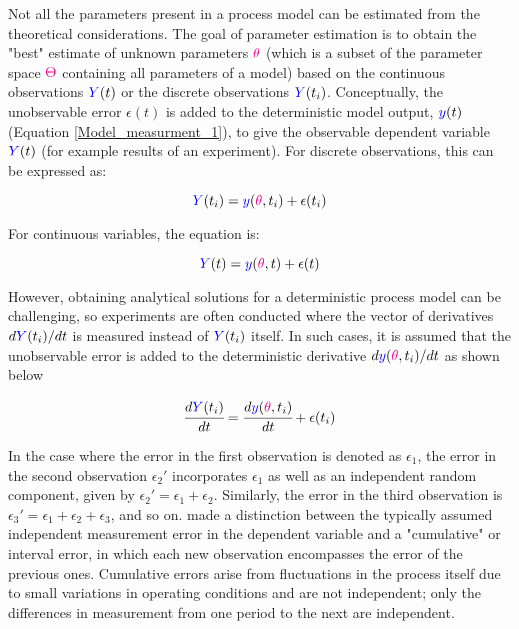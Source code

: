 \documentclass[../Article_Model_Parameters.tex]{subfiles}
\begin{document}
	Not all the parameters present in a process model can be estimated from the theoretical considerations. The goal of parameter estimation is to obtain the "best" estimate of unknown parameters ${\color{magenta} \theta}$ (which is a subset of the parameter space ${\color{magenta}\Theta}$ containing all parameters of a model) based on the continuous observations ${\color{blue}Y}(t)$ or the discrete observations ${\color{blue}Y}(t_i)$. Conceptually, the unobservable error $\epsilon(t)$ is added to the deterministic model output, ${\color{blue}y}(t)$ (Equation \ref{Model_measurment_1}), to give the observable dependent variable ${\color{blue}Y}(t)$ (for example results of an experiment). For discrete observations, this can be expressed as:
	
	{\footnotesize
		\begin{equation*}
			{\color{blue}Y}(t_i) = {\color{blue}y}({\color{magenta} \theta}, t_i) + \epsilon(t_i)
	\end{equation*} }
	
	For continuous variables, the equation is:
	
	{\footnotesize
		\begin{equation*}
			{\color{blue}Y}(t) = {\color{blue}y}({\color{magenta} \theta}, t) + \epsilon(t)
	\end{equation*} }
	
	However, obtaining analytical solutions for a deterministic process model can be challenging, so experiments are often conducted where the vector of derivatives $d{\color{blue}Y}(t_i)/dt$ is measured instead of ${\color{blue}Y}(t_i)$ itself. In such cases, it is assumed that the unobservable error is added to the deterministic derivative $d{\color{blue}y}({\color{magenta} \theta}, t_i)/dt$ as shown below
	
	{\footnotesize
		\begin{equation}  \label{EQ: Measurment_noise}
			\cfrac{d {\color{blue}Y}(t_i)}{dt} = \cfrac{d{\color{blue}y}({\color{magenta} \theta}, t_i)}{dt} + \epsilon(t_i)
	\end{equation} }
	
	In the case where the error in the first observation is denoted as $\epsilon_1$, the error in the second observation $\epsilon_2'$ incorporates $\epsilon_1$ as well as an independent random component, given by $\epsilon_2' = \epsilon_1 + \epsilon_2$. Similarly, the error in the third observation is $\epsilon_3' = \epsilon_1 + \epsilon_2 + \epsilon_3$, and so on. \citet{Mandel1957}  made a distinction between the typically assumed independent measurement error in the dependent variable and a "cumulative" or interval error, in which each new observation encompasses the error of the previous ones. Cumulative errors arise from fluctuations in the process itself due to small variations in operating conditions and are not independent; only the differences in measurement from one period to the next are independent.
	
\end{document}
